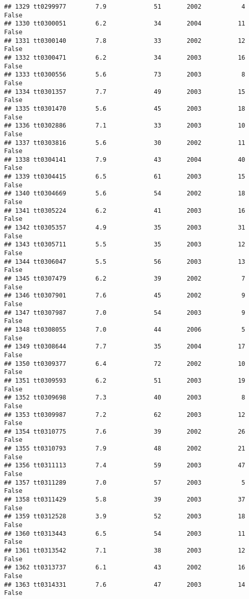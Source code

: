 \documentclass[
]{article}
\begin{document}
\begin{verbatim}
## 1329 tt0299977        7.9             51       2002           4   False
## 1330 tt0300051        6.2             34       2004          11   False
## 1331 tt0300140        7.8             33       2002          12   False
## 1332 tt0300471        6.2             34       2003          16   False
## 1333 tt0300556        5.6             73       2003           8   False
## 1334 tt0301357        7.7             49       2003          15   False
## 1335 tt0301470        5.6             45       2003          18   False
## 1336 tt0302886        7.1             33       2003          10   False
## 1337 tt0303816        5.6             30       2002          11   False
## 1338 tt0304141        7.9             43       2004          40   False
## 1339 tt0304415        6.5             61       2003          15   False
## 1340 tt0304669        5.6             54       2002          18   False
## 1341 tt0305224        6.2             41       2003          16   False
## 1342 tt0305357        4.9             35       2003          31   False
## 1343 tt0305711        5.5             35       2003          12   False
## 1344 tt0306047        5.5             56       2003          13   False
## 1345 tt0307479        6.2             39       2002           7   False
## 1346 tt0307901        7.6             45       2002           9   False
## 1347 tt0307987        7.0             54       2003           9   False
## 1348 tt0308055        7.0             44       2006           5   False
## 1349 tt0308644        7.7             35       2004          17   False
## 1350 tt0309377        6.4             72       2002          10   False
## 1351 tt0309593        6.2             51       2003          19   False
## 1352 tt0309698        7.3             40       2003           8   False
## 1353 tt0309987        7.2             62       2003          12   False
## 1354 tt0310775        7.6             39       2002          26   False
## 1355 tt0310793        7.9             48       2002          21   False
## 1356 tt0311113        7.4             59       2003          47   False
## 1357 tt0311289        7.0             57       2003           5   False
## 1358 tt0311429        5.8             39       2003          37   False
## 1359 tt0312528        3.9             52       2003          18   False
## 1360 tt0313443        6.5             54       2003          11   False
## 1361 tt0313542        7.1             38       2003          12   False
## 1362 tt0313737        6.1             43       2002          16   False
## 1363 tt0314331        7.6             47       2003          14   False

\end{verbatim}
\end{document}
